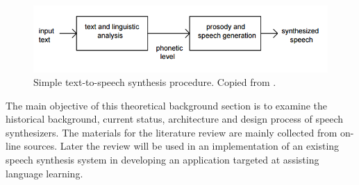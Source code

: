 \documentclass[11pt,a4paper,oneside,article]{memoir}
\begin{document}
\begin{figure}[h]
  \includegraphics[width=15cm]{tts}
  \caption{Simple text-to-speech synthesis procedure. Copied from \cite{hut}.}
  \label{fig:tts}
\end{figure}

%
%

The main objective of this theoretical background section is to examine the historical background, current status, architecture and design process of speech synthesizers. The materials for the literature review are mainly collected from on-line sources. Later the review will be used in an implementation of an existing speech synthesis system in developing an application targeted at assisting language learning.
\end{document}
